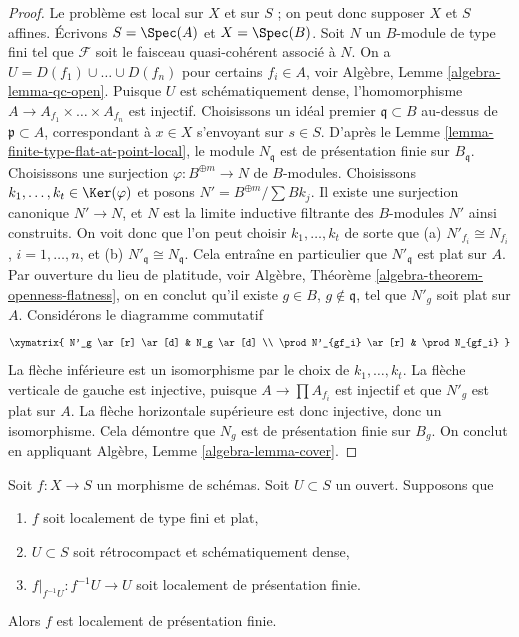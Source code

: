 \begin{proof}
Le problème est local sur $X$ et sur $S$ ; on peut donc supposer $X$ et $S$ affines.
Écrivons $S = \Spec(A)$ et $X = \Spec(B)$. Soit $N$ un $B$-module de type fini tel
que $\mathcal{F}$ soit le faisceau quasi-cohérent associé à $N$.
On a $U = D(f_1) \cup \ldots \cup D(f_n)$ pour certains $f_i \in A$, voir
Algèbre, Lemme \ref{algebra-lemma-qc-open}.
Puisque $U$ est schématiquement dense, l'homomorphisme
$A \to A_{f_1} \times \ldots \times A_{f_n}$ est injectif.
Choisissons un idéal premier $\mathfrak q \subset B$ au-dessus de $\mathfrak p \subset A$,
correspondant à $x \in X$ s'envoyant sur $s \in S$.
D'après le Lemme \ref{lemma-finite-type-flat-at-point-local},
le module $N_\mathfrak q$ est de présentation finie sur $B_\mathfrak q$.
Choisissons une surjection $\varphi : B^{\oplus m} \to N$ de $B$-modules.
Choisissons $k_1, \ldots, k_t \in \Ker(\varphi)$ et
posons $N' = B^{\oplus m}/\sum Bk_j$. Il existe une surjection canonique
$N' \to N$, et $N$ est la limite inductive filtrante des $B$-modules $N'$
ainsi construits. On voit donc que l'on peut choisir
$k_1, \ldots, k_t$ de sorte que (a) $N'_{f_i} \cong N_{f_i}$, $i = 1, \ldots, n$,
et (b) $N'_\mathfrak q \cong N_\mathfrak q$.
Cela entraîne en particulier que $N'_\mathfrak q$ est plat sur $A$.
Par ouverture du lieu de platitude, voir
Algèbre, Théorème \ref{algebra-theorem-openness-flatness},
on en conclut qu'il existe $g \in B$, $g \not \in \mathfrak q$,
tel que $N'_g$ soit plat sur $A$. Considérons le diagramme commutatif
$$
\xymatrix{
N'_g \ar[r] \ar[d] & N_g \ar[d] \\
\prod N'_{gf_i} \ar[r] & \prod N_{gf_i}
}
$$
La flèche inférieure est un isomorphisme par le choix de $k_1, \ldots, k_t$.
La flèche verticale de gauche est injective, puisque
$A \to \prod A_{f_i}$ est injectif et que $N'_g$ est plat sur $A$.
La flèche horizontale supérieure est donc injective, donc un isomorphisme.
Cela démontre que $N_g$ est de présentation finie sur $B_g$.
On conclut en appliquant
Algèbre, Lemme \ref{algebra-lemma-cover}.
\end{proof}

\begin{lemma}
\label{lemma-flat-finite-type-finitely-presented-over-dense-open-X}
Soit $f : X \to S$ un morphisme de schémas. Soit $U \subset S$ un ouvert.
Supposons que
\begin{enumerate}
\item $f$ soit localement de type fini et plat,
\item $U \subset S$ soit rétrocompact et schématiquement dense,
\item $f|_{f^{-1}U} : f^{-1}U \to U$ soit localement de présentation finie.
\end{enumerate}
Alors $f$ est localement de présentation finie.
\end{lemma}

